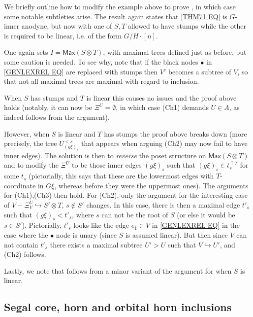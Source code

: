 \documentclass[a4paper,10pt
]{article}%
\begin{document}
 
\begin{remark}
We briefly outline how to modify the example above to prove 
\cite[Thm 7.1(ii)]{Per17}, in which case some notable subtleties arise.
The result again states that \eqref{THM71 EQ} is $G$-inner anodyne, but now with one of $S,T$ allowed to have stumps while the other is required to be linear, i.e. of the form $G/H \cdot [n]$.

One again sets $I=\mathsf{Max}(S\otimes T)$, with maximal trees defined just as before, but some caution is needed.
To see why, note that if the black nodes $\bullet$ in \eqref{GENLEXREL EQ} are replaced with stumps then $V'$
becomes a subtree of $V$, so that not all maximal trees are maximal with regard to inclusion.

When $S$ has stumps and $T$ is linear this causes no issues and the proof above holds
(notably, it can now be 
$\Xi^U = \emptyset$, in which case (Ch1) demands $U \in A$,
as indeed follows from the argument).

However, when $S$ is linear and $T$ has stumps the proof above breaks down (more precisely, the tree $U_{(g\xi)_s}^{<s}$ that appears when arguing (Ch2) may now fail to have inner edges). The solution is then to \textit{reverse} the poset structure on 
$\mathsf{Max}(S\otimes T)$
and to modify the $\Xi^U$ to be those inner edges $(g \xi)_s$ such that
$(g \xi)_s \in t_s^{\uparrow T}$ for some $t_s$
(pictorially, this says that these are the lowermost edges with $T$-coordinate in $G\xi$, whereas before they were the uppermost ones). The arguments for (Ch1),(Ch3) then hold.
For (Ch2), only the argument for the interesting case of
$V- \Xi_V^U \hookrightarrow S' \otimes T$, $s \not \in S'$
changes. In this case, there is then a maximal edge $t'_s$ such that $(g \xi)_s < t'_s$, where $s$ can not be the root of $S$ (or else it would be $s \in S'$). Pictorially, $t'_s$ looks like the edge $e_1 \in V$ in \eqref{GENLEXREL EQ} in the case where the $\bullet$ node is unary (since $S$ is assumed linear). But then since $V$ can not contain $t'_s$ there exists a maximal subtree $U' > U$ such that $V \hookrightarrow U'$,
and (Ch2) follows.

Lastly, we note that \cite[Thm. 7.2]{Per17} follows from a minor variant of the argument for \cite[Thm. 7.1(ii)]{Per17} when $S$ is linear.
\end{remark}



\subsection{Segal core, horn and orbital horn inclusions}\label{HYPERSAT SEC}
\end{document}

